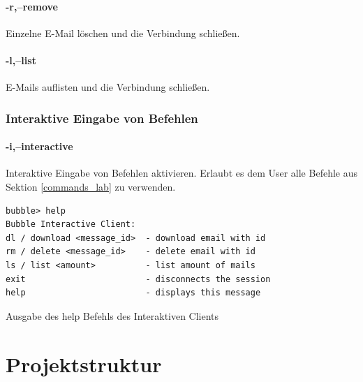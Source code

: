 \documentclass[12pt, letterpaper]{article}
\newenvironment{code}{\captionsetup{type=listing}}{}
\begin{document}
\paragraph{-r,--remove}
Einzelne E-Mail löschen und die Verbindung schließen.

\paragraph{-l,--list}
E-Mails auflisten und die Verbindung schließen.

\subsubsection{Interaktive Eingabe von Befehlen}
\paragraph{-i,--interactive}
Interaktive Eingabe von Befehlen aktivieren. Erlaubt es dem User alle Befehle aus Sektion \ref{commands_lab} zu verwenden.

\begin{code}
  \begin{verbatim}
bubble> help
Bubble Interactive Client:
dl / download <message_id>  - download email with id
rm / delete <message_id>    - delete email with id
ls / list <amount>          - list amount of mails
exit                        - disconnects the session
help                        - displays this message
  \end{verbatim}
  \caption{Ausgabe des help Befehls des Interaktiven Clients}
\end{code}

\newpage

\section{Projektstruktur}
\hfill

\newpage


\end{document}
